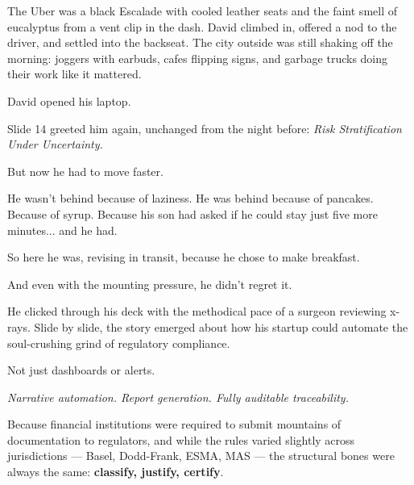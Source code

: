 The Uber was a black Escalade with cooled leather seats and the faint smell of eucalyptus from a vent 
clip in the dash. David climbed in, offered a nod to the driver, and settled into the backseat. The 
city outside was still shaking off the morning: joggers with earbuds, cafes flipping signs, and garbage 
trucks doing their work like it mattered.

David opened his laptop.

Slide 14 greeted him again, unchanged from the night before:
\textit{Risk Stratification Under Uncertainty.}

But now he had to move faster.

He wasn’t behind because of laziness. He was behind because of pancakes. Because of syrup. 
Because his son had asked if he could stay just five more minutes... and he had.

So here he was, revising in transit, because he chose to make breakfast.

And even with the mounting pressure, he didn’t regret it.

He clicked through his deck with the methodical pace of a surgeon reviewing x-rays. Slide by slide, the story emerged
about how his startup could automate the soul-crushing grind of regulatory compliance.

Not just dashboards or alerts.

\textit{Narrative automation. Report generation. Fully auditable traceability.}

Because financial institutions were required to submit mountains of documentation to regulators, and while the 
rules varied slightly across jurisdictions — Basel, Dodd-Frank, ESMA, MAS — the structural bones were always the same:
\textbf{classify, justify, certify}.

\medskip

